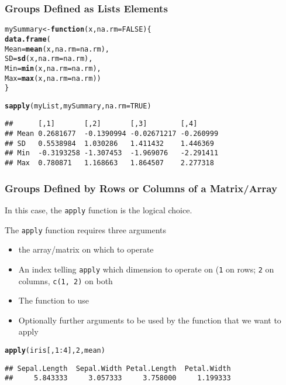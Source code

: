 \documentclass[paper=screen,mathserif]{beamer}\usepackage[]{graphicx}\usepackage[]{color}
\makeatletter
\newcommand{\hlnum}[1]{\textcolor[rgb]{0.686,0.059,0.569}{#1}}%
\newcommand{\hlopt}[1]{\textcolor[rgb]{0,0,0}{#1}}%
\newcommand{\hlstd}[1]{\textcolor[rgb]{0.345,0.345,0.345}{#1}}%
\newcommand{\hlkwa}[1]{\textcolor[rgb]{0.161,0.373,0.58}{\textbf{#1}}}%
\newcommand{\hlkwb}[1]{\textcolor[rgb]{0.69,0.353,0.396}{#1}}%
\newcommand{\hlkwc}[1]{\textcolor[rgb]{0.333,0.667,0.333}{#1}}%
\newcommand{\hlkwd}[1]{\textcolor[rgb]{0.737,0.353,0.396}{\textbf{#1}}}%
\newenvironment{kframe}{%
 \def\at@end@of@kframe{}%
 \ifinner\ifhmode%
  \def\at@end@of@kframe{\end{minipage}}%
  \begin{minipage}{\columnwidth}%
 \fi\fi%
 \def\FrameCommand##1{\hskip\@totalleftmargin \hskip-\fboxsep
 \colorbox{shadecolor}{##1}\hskip-\fboxsep
     \hskip-\linewidth \hskip-\@totalleftmargin \hskip\columnwidth}%
 \MakeFramed {\advance\hsize-\width
   \@totalleftmargin\z@ \linewidth\hsize
   \@setminipage}}%
 {\par\unskip\endMakeFramed%
 \at@end@of@kframe}
\newenvironment{knitrout}{}{} %
\newcommand{\ft}[1]{\frametitle{#1}}
\makeatother
\begin{document}
\begin{frame}[fragile]
  \ft{Groups Defined as Lists Elements}
  
\begin{knitrout}\scriptsize
{}\color{fgcolor}\begin{kframe}
\begin{alltt}
\hlstd{mySummary} \hlkwb{<-} \hlkwa{function}\hlstd{(}\hlkwc{x}\hlstd{,} \hlkwc{na.rm} \hlstd{=} \hlnum{FALSE}\hlstd{) \{}
    \hlkwd{data.frame}\hlstd{(}
        \hlkwc{Mean} \hlstd{=} \hlkwd{mean}\hlstd{(x,} \hlkwc{na.rm} \hlstd{= na.rm),}
        \hlkwc{SD} \hlstd{=} \hlkwd{sd}\hlstd{(x,} \hlkwc{na.rm} \hlstd{= na.rm),}
        \hlkwc{Min} \hlstd{=} \hlkwd{min}\hlstd{(x,} \hlkwc{na.rm} \hlstd{= na.rm),}
        \hlkwc{Max} \hlstd{=} \hlkwd{max}\hlstd{(x,} \hlkwc{na.rm} \hlstd{= na.rm))}
\hlstd{\}}

\hlkwd{sapply}\hlstd{(myList, mySummary,} \hlkwc{na.rm} \hlstd{=} \hlnum{TRUE}\hlstd{)}
\end{alltt}
\begin{verbatim}
##      [,1]       [,2]       [,3]        [,4]     
## Mean 0.2681677  -0.1390994 -0.02671217 -0.260999
## SD   0.5538984  1.030286   1.411432    1.446369 
## Min  -0.3193258 -1.307453  -1.969076   -2.291411
## Max  0.780871   1.168663   1.864507    2.277318
\end{verbatim}
\end{kframe}
\end{knitrout}
\end{frame}


\begin{frame}[fragile]
  \ft{Groups Defined by Rows or Columns of a Matrix/Array}
  
  In this case, the {\tt apply} function is the logical choice. 
  
  The \verb=apply= function requires three arguments
  \begin{itemize}
  \item the array/matrix on which to operate
  \item An index telling \verb=apply= which dimension to operate on (\verb=1=
    on rows; \verb=2= on columns, \verb=c(1, 2)= on both
  \item The function to use
  \item Optionally further arguments to be used by the function that
    we want to apply
  \end{itemize}
 
\begin{knitrout}\scriptsize
{}\color{fgcolor}\begin{kframe}
\begin{alltt}
\hlkwd{apply}\hlstd{(iris[,} \hlnum{1}\hlopt{:}\hlnum{4}\hlstd{],} \hlnum{2}\hlstd{, mean)}
\end{alltt}
\begin{verbatim}
## Sepal.Length  Sepal.Width Petal.Length  Petal.Width 
##     5.843333     3.057333     3.758000     1.199333
\end{verbatim}
\end{kframe}
\end{knitrout}
\end{frame}
\end{document}

